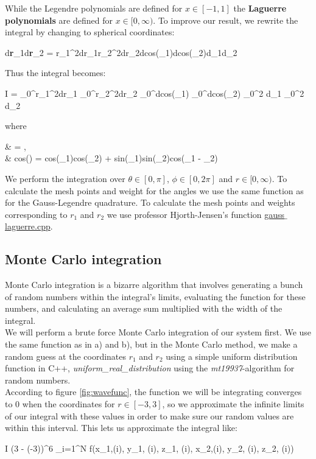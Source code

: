 \documentclass{article}
\begin{document}
		While the Legendre polynomials are defined for $x \in [-1, 1]$ the \textbf{Laguerre polynomials} are defined for $x \in [0, \infty)$. To improve our result, we rewrite the integral by changing to spherical coordinates:
		\begin{flalign*}
			d\textbf{r}_1d\textbf{r}_2 = r_1^2dr_1r_2^2dr_2dcos(\theta_1)dcos(\theta_2)d\phi_1d\phi_2
		\end{flalign*}

		Thus the integral becomes:
		\begin{flalign*}
			I = \int_0^\infty r_1^2dr_1 \int_0^\infty r_2^2dr_2 \int_0^\pi dcos(\theta_1) \int_0^\pi dcos(\theta_2) \int_0^{2\pi} d\phi_1 \int_0^{2\pi} d\phi_2 \frac{e^{-2\alpha(r_1+r_2)}}{r_{12}}
		\end{flalign*}

		where
		\begin{flalign*}
			&  = \frac{}{\sqrt{r_1^2 + r_2^2 - 2r_1r_2cos(\beta)}}, \\
			& cos(\beta) = cos(\theta_1)cos(\theta_2) + sin(\theta_1)sin(\theta_2)cos(\phi_1 - \phi_2)
		\end{flalign*}

		We perform the integration over $\theta \in [0, \pi]$, $\phi \in [0, 2\pi]$ and $r \in [0, \infty)$. To calculate the mesh points and weight for the angles we use the same function as for the Gauss-Legendre quadrature. To calculate the mesh points and weights corresponding to $r_1$ and $r_2$ we use professor Hjorth-Jensen's function \href{https://github.com/CompPhysics/ComputationalPhysics/blob/master/doc/Projects/2019/Project3/CodeExamples/gauss-laguerre.cpp}{gauss$\_$laguerre.cpp}.

	\subsection*{Monte Carlo integration}
		Monte Carlo integration is a bizarre algorithm that involves generating a bunch of random numbers within the integral's limits, evaluating the function for these numbers, and calculating an average sum multiplied with the width of the integral.\\

		We will perform a brute force Monte Carlo integration of our system first. We use the same function as in a) and b), but in the Monte Carlo method, we make a random guess at the coordinates $r_1$ and $r_2$ using a simple uniform distribution function in C++, \textit{uniform\_real\_distribution} using the \textit{mt19937}-algorithm for random numbers.\\
		According to figure \ref{fig:wavefunc}, the function we will be integrating converges to 0 when the coordinates for $r \in [-3,3]$, so we approximate the infinite limits of our integral with these values in order to make sure our random values are within this interval. This lets us approximate the integral like:
		\begin{flalign*}
			I \approx (3 - (-3))^{6}  \sum_{i=1}^{N} f(x_{1,(i)}, y_{1, (i)}, z_{1, (i)}, x_{2,(i)}, y_{2, (i)}, z_{2, (i)})
		\end{flalign*}
\end{document}
